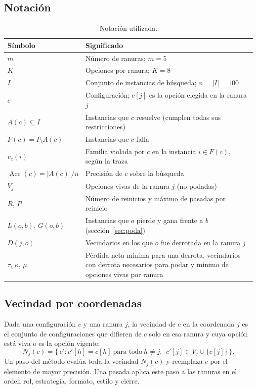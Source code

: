 \documentclass[12pt,letterpaper]{article}
\theoremstyle{definition}
\newcommand{\Acc}{\operatorname{Acc}}
\begin{document}
\subsection{Notación}\label{sec:notacion}

\begin{table}[H]
\caption{Notación utilizada.}
\begin{tabularx}{\textwidth}{@{}p{4.6cm}L@{}}
\toprule
Símbolo & Significado \\
\midrule
$m$ & Número de ranuras; $m = 5$ \\
$K$ & Opciones por ranura; $K = 8$ \\
$I$ & Conjunto de instancias de búsqueda; $n = |I| = 100$ \\
$c$ & Configuración; $c[j]$ es la opción elegida en la ranura $j$ \\
$A(c) \subseteq I$ & Instancias que $c$ resuelve (cumplen todas sus restricciones) \\
$F(c) = I \setminus A(c)$ & Instancias que $c$ falla \\
$v_c(i)$ & Familia violada por $c$ en la instancia $i \in F(c)$, según la traza \\
$\Acc(c) = |A(c)|/n$ & Precisión de $c$ sobre la búsqueda \\
$V_j$ & Opciones vivas de la ranura $j$ (no podadas) \\
$R$, $P$ & Número de reinicios y máximo de pasadas por reinicio \\
$L(o,b)$, $G(o,b)$ & Instancias que $o$ pierde y gana frente a $b$ (sección~\ref{sec:poda}) \\
$D(j,o)$ & Vecindarios en los que $o$ fue derrotada en la ranura $j$ \\
$\tau$, $\kappa$, $\mu$ & Pérdida neta mínima para una derrota, vecindarios con derrota necesarios para podar y mínimo de opciones vivas por ranura \\
\bottomrule
\end{tabularx}
\end{table}

\subsection{Vecindad por coordenadas}
Dada una configuración $c$ y una ranura $j$, la vecindad de $c$ en la coordenada $j$ es el conjunto de configuraciones que difieren de $c$ solo en esa ranura y cuya opción está viva o es la opción vigente:
\[
N_j(c) = \{\, c' : c'[h] = c[h] \ \text{para todo}\ h \neq j,\ \ c'[j] \in V_j \cup \{c[j]\} \,\}.
\]
Un paso del método evalúa toda la vecindad $N_j(c)$ y reemplaza $c$ por el elemento de mayor precisión. Una pasada aplica este paso a las ranuras en el orden rol, estrategia, formato, estilo y cierre.
\end{document}
